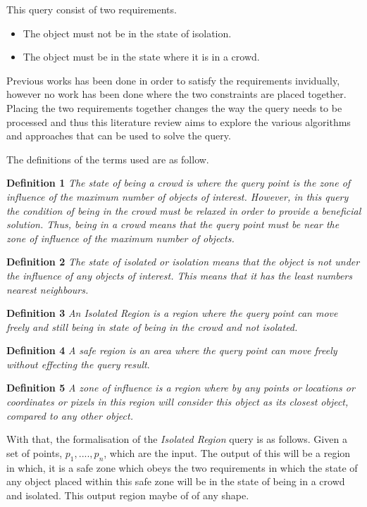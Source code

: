 \documentclass[a4paper,11pt]{article}
\begin{document}
This query consist of two requirements.
\begin{itemize}
	\item The object must not be in the state of isolation.
	\item The object must be in the state where it is in a crowd.
\end{itemize}

Previous works has been done in order to satisfy the requirements invidually,  however no work has been done where the two constraints are placed together. Placing the two requirements together changes the way the query needs to be processed and thus this literature review aims to explore the various algorithms and approaches that can be used to solve the query. 

The definitions of the terms used are as follow.

\textbf{Definition 1} \textit{The state of being a crowd is where the query point is the zone of influence of the maximum number of objects of interest. However, in this query the condition of being in the crowd must be relaxed in order to provide a beneficial solution. Thus, being in a crowd means that the query point must be near the zone of influence of the maximum number of objects.
}

\textbf{Definition 2} \textit{The state of isolated or isolation means that the object is not under the influence of any objects of interest. This means that it has the least numbers nearest neighbours. }

\textbf{Definition 3} \textit{An Isolated Region is a region where the query point can move freely and still being in state of being in the crowd and not isolated.}

\textbf{Definition 4} \textit{A safe region is an area where the query point can move freely without effecting the query result}.

\textbf{Definition 5} \textit{A zone of influence is a region where by any points or locations or coordinates or pixels in this region will consider this object as its closest object, compared to any other object.}


With that, the formalisation of the \textit{Isolated Region} query is as follows. Given a set of points, $p_1,....,p_n$, which are the input. The output of this will be a region in which, it is a safe zone which obeys the two requirements in which the state of any object placed within this safe zone will be in the state of being in a crowd and isolated. This output region maybe of of any shape.
\end{document}
